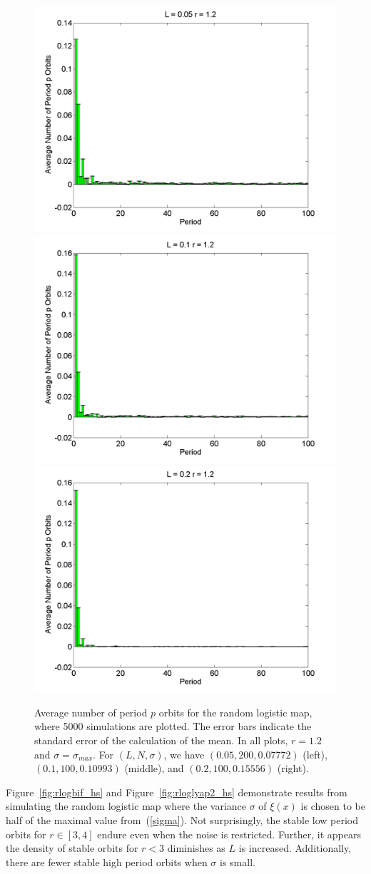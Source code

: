 \begin{figure}[H]\linespread{1}
\caption[Average number of period $p$ orbits for the random logistic
map, $\sigma=\sigma_{max}$ and $r=1.2$]{Average number of period $p$ orbits for the random logistic
map, where 5000 simulations are plotted. The error bars indicate
the standard error of the calculation of the mean. In all plots,
$r=1.2$ and $\sigma=\sigma_{max}$. For $(L,N,\sigma)$,
we have $(0.05, 200, 0.07772)$ (left), $(0.1, 100, 0.10993)$
(middle), and $(0.2, 100, 0.15556)$ (right).}\label{fig:rloghist2}
	\begin{center}	\includegraphics[width=.33\textwidth]{figs/rlog_hist_L_005_r_12_s_007772_a_000015098_sims_5000.png}\hfill
\includegraphics[width=.33\textwidth]{figs/rlog_hist_L_01_r_12_s_010993_a_000060373_sims_5000.png}\hfill	
\includegraphics[width=.33\textwidth]{figs/rlog_hist_L_02_r_12_s_015556_a_00024119_sims_5000.png}
	\end{center}
\end{figure}
Figure~\ref{fig:rlogbif_hs} and Figure~\ref{fig:rloglyap2_hs}
demonstrate results from simulating the random logistic map where the
variance $\sigma$ of $\xi(x)$ is chosen to be half of the maximal
value from~(\ref{sigma}). Not surprisingly, the stable low period
orbits for $r \in [3,4]$ endure even
when the noise is restricted. Further, it appears the density of
stable orbits for $r<3$ diminishes as $L$ is increased. Additionally,
there are fewer stable high period orbits when $\sigma$ is small.


